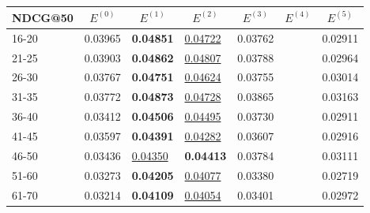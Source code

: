 \begin{table*}[]
    \centering
    \begin{tabular}{|l|l|l|l|l|l|l|}
        \hline
        NDCG@50 & \multicolumn{1}{c|}{$E^{(0)}$} & \multicolumn{1}{c|}{$E^{(1)}$} & \multicolumn{1}{c|}{$E^{(2)}$} & \multicolumn{1}{c|}{$E^{(3)}$} & \multicolumn{1}{c|}{$E^{(4)}$} & \multicolumn{1}{c|}{$E^{(5)}$} \\ \hline
        16-20   & 0.03965                        & \textbf{0.04851}               & \underline{0.04722}            & 0.03762                        &                                & 0.02911                        \\ \hline
        21-25   & 0.03903                        & \textbf{0.04862}               & \underline{0.04807}            & 0.03788                        &                                & 0.02964                        \\ \hline
        26-30   & 0.03767                        & \textbf{0.04751}               & \underline{0.04624}            & 0.03755                        &                                & 0.03014                        \\ \hline
        31-35   & 0.03772                        & \textbf{0.04873}               & \underline{0.04728}            & 0.03865                        &                                & 0.03163                        \\ \hline
        36-40   & 0.03412                        & \textbf{0.04506}               & \underline{0.04495}            & 0.03730                        &                                & 0.02911                        \\ \hline
        41-45   & 0.03597                        & \textbf{0.04391}               & \underline{0.04282}            & 0.03607                        &                                & 0.02916                        \\ \hline
        46-50   & 0.03436                        & \underline{0.04350}            & \textbf{0.04413}               & 0.03784                        &                                & 0.03111                        \\ \hline
        51-60   & 0.03273                        & \textbf{0.04205}               & \underline{0.04077}            & 0.03380                        &                                & 0.02719                        \\ \hline
        61-70   & 0.03214                        & \textbf{0.04109}               & \underline{0.04054}            & 0.03401                        &                                & 0.02972                        \\ \hline

\end{tabular}
\end{table*}
